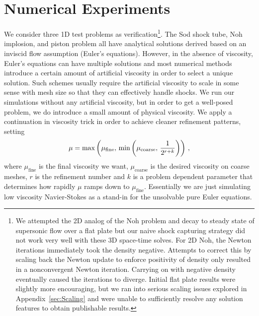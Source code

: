 \documentclass[Dissertation.tex]{subfiles}
\begin{document}
\section{Numerical Experiments}
We consider three 1D test problems as verification\footnote{
We attempted the 2D analog of the Noh problem and decay to steady state of supersonic flow over a flat plate but our naive shock
capturing strategy did not work very well with these 3D space-time solves.
For 2D Noh, the Newton iterations immediately took the density negative. 
Attempts to correct this by scaling back the Newton update to enforce positivity of density only resulted in a nonconvergent Newton iteration.
Carrying on with negative density eventually caused the iterations to diverge.
Initial flat plate results were slightly more encouraging,
but we ran into serious scaling issues explored in Appendix~\ref{sec:Scaling}
and were unable to sufficiently resolve any solution features to obtain publishable results.
}.
The Sod shock tube, Noh implosion, and piston problem all have analytical solutions derived based on an inviscid flow assumption (Euler's equations).
However, in the absence of viscosity, Euler's equations can have multiple solutions and most numerical methods introduce a certain amount of
artificial viscosity in order to select a unique solution.
Such schemes usually require the artificial viscosity to scale in some sense with mesh size so that they can effectively handle shocks.
We run our simulations without any artificial viscosity, but in order to get a well-posed problem, we do introduce a small amount of physical viscosity.
We apply a continuation in viscosity trick in order to achieve cleaner refinement patterns, setting
\[
\mu=\max\left( \mu_\text{fine},\,\min\left( \mu_\text{coarse},\,\frac{1}{2^{r+k}} \right) \right)\,,
\]
where $\mu_\text{fine}$ is the final viscosity we want, $\mu_\text{coarse}$ 
is the desired viscosity on coarse meshes,
$r$ is the refinement number and $k$ is a problem dependent parameter that determines how rapidly $\mu$
ramps down to $\mu_\text{fine}$.
Essentially we are just simulating low viscosity Navier-Stokes as a stand-in for the unsolvable pure Euler equations.
\end{document}
